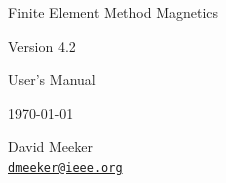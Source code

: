 \documentclass[12pt]{report}
\begin{document}
\thispagestyle{empty}

\vspace*{2.5in}

\vspace*{0.5in}
\begin{center}
{\LARGE Finite Element Method Magnetics}

\vspace*{16pt} {\Large Version 4.2}

\vspace*{16pt} {\Large User's Manual}

\vspace*{16pt} \today

\vspace*{48pt} David Meeker \\
\href{mailto:dmeeker@ieee.org}{\tt dmeeker@ieee.org} \\
\end{center}

\newpage
\end{document}

